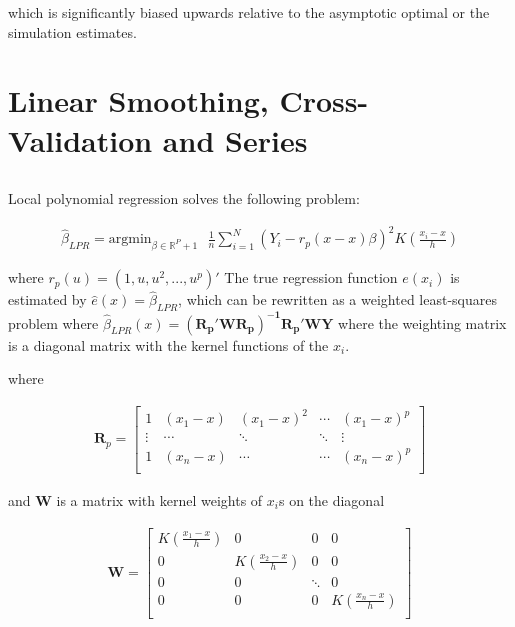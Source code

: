\documentclass[12pt]{article}
\newcommand{\R}{\mathbb{R}}
\begin{document}
which is significantly biased upwards relative to the asymptotic optimal or the simulation estimates.


\newpage
\section{Linear Smoothing, Cross-Validation and Series}
\subsection{}

Local polynomial regression solves the following problem:

\begin{gather*}
\hat{\beta}_{LPR} =  \text{argmin}_{\beta \in \R^P+1} \text{    } \frac{1}{n}\sum\limits_{i=1}^N \left(Y_i - r_p(x-x)\beta  \right)^2 K(\frac{x_i - x}{h})
\end{gather*}

where $ r_p(u) =(1,u,u^2,...,u^p)' $ The true regression function $e(x_i)$ is estimated by $\hat{e}(x) = \hat{\beta}_{LPR}$, which can be rewritten as a weighted least-squares problem where $ \hat{\beta}_{LPR}(x) = \mathbf{ (R_p' W R_p)^{-1} R_p'WY } $  where the weighting matrix is a diagonal matrix with the kernel functions of the $ x_i $.

where

\begin{gather*}
\mathbf{R}_p = \begin{bmatrix}
1 & (x_1 - x) & (x_1 - x)^2 & \cdots & (x_1 - x)^p \\
\vdots & \cdots & \ddots & \ddots & \vdots \\
1 & (x_n - x) & \cdots & \cdots & (x_n - x)^p \\
\end{bmatrix}
\end{gather*}

and $\mathbf{W}$ is a matrix with kernel weights of $x_i$s on the diagonal

\begin{gather*}
\mathbf{W}  = \begin{bmatrix}
K(\frac{x_1 - x}{h}) & 0 & 0 & 0 \\
0 & K(\frac{x_2 - x}{h}) & 0 & 0 \\
0 & 0 & \ddots & 0 \\
0 & 0 & 0 & K(\frac{x_n - x}{h})  \\
\end{bmatrix}
\end{gather*}
\end{document}
